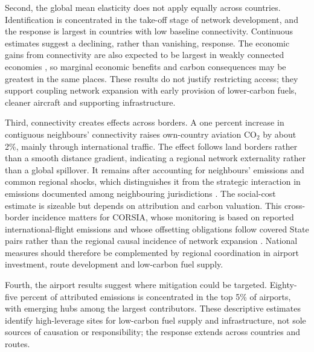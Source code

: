 \documentclass[12pt]{extarticle}
\begin{document}
Second, the global mean elasticity does not apply equally across countries. Identification is concentrated in the take-off stage of network development, and the response is largest in countries with low baseline connectivity. Continuous estimates suggest a declining, rather than vanishing, response. The economic gains from connectivity are also expected to be largest in weakly connected economies \citep{lenaerts2021,zhang2020,amico2026}, so marginal economic benefits and carbon consequences may be greatest in the same places. These results do not justify restricting access; they support coupling network expansion with early provision of lower-carbon fuels, cleaner aircraft and supporting infrastructure.

Third, connectivity creates effects across borders. A one percent increase in contiguous neighbours' connectivity raises own-country aviation CO$_2$ by about 2\%, mainly through international traffic. The effect follows land borders rather than a smooth distance gradient, indicating a regional network externality rather than a global spillover. It remains after accounting for neighbours' emissions and common regional shocks, which distinguishes it from the strategic interaction in emissions documented among neighbouring jurisdictions \citep{zhuwei2024}. The social-cost estimate is sizeable but depends on attribution and carbon valuation. This cross-border incidence matters for CORSIA, whose monitoring is based on reported international-flight emissions and whose offsetting obligations follow covered State pairs rather than the regional causal incidence of network expansion \citep{icao2018corsia}. National measures should therefore be complemented by regional coordination in airport investment, route development and low-carbon fuel supply.

Fourth, the airport results suggest where mitigation could be targeted. Eighty-five percent of attributed emissions is concentrated in the top 5\% of airports, with emerging hubs among the largest contributors. These descriptive estimates identify high-leverage sites for low-carbon fuel supply and infrastructure, not sole sources of causation or responsibility; the response extends across countries and routes.
\end{document}
